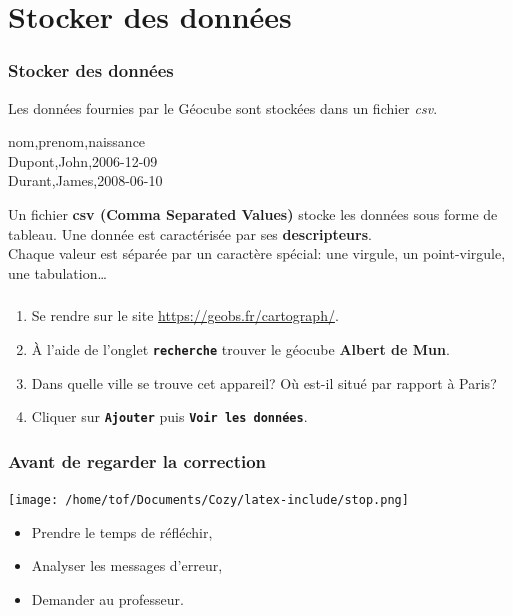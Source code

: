 \documentclass[svgnames,11pt]{beamer}
\begin{document}
\section{Stocker des données}
\begin{frame}
    \frametitle{Stocker des données}
    Les données fournies par le Géocube sont stockées dans un fichier \emph{csv}.
    \begin{center}
        nom,prenom,naissance\\
        Dupont,John,2006-12-09\\
        Durant,James,2008-06-10
    \end{center}
    \begin{aretenir}[]
        Un fichier \textbf{csv (Comma Separated Values)} stocke les données sous forme de tableau. Une donnée est caractérisée par ses \textbf{descripteurs}. \\
        Chaque valeur est séparée par un caractère spécial: une virgule, un point-virgule, une tabulation\dots
    \end{aretenir}

\end{frame}
\begin{frame}
    \frametitle{}

    \begin{activite}
        \begin{enumerate}
            \item Se rendre sur le site \url{https://geobs.fr/cartograph/}.
            \item À l'aide de l'onglet \textbf{\texttt{recherche}} trouver le géocube \textbf{Albert de Mun}.
            \item Dans quelle ville se trouve cet appareil? Où est-il situé par rapport à Paris?
            \item Cliquer sur \textbf{\texttt{Ajouter}} puis \textbf{\texttt{Voir les données}}.
        \end{enumerate}
    \end{activite}

\end{frame}
\begin{frame}
    \frametitle{Avant de regarder la correction}
    \begin{center}
        \centering
        \texttt{[image: /home/tof/Documents/Cozy/latex-include/stop.png]}
    \end{center}
    {\Large
    \begin{itemize}
        \item Prendre le temps de réfléchir,
        \item Analyser les messages d'erreur,
        \item Demander au professeur.
    \end{itemize}
    }
\end{frame}
\end{document}
